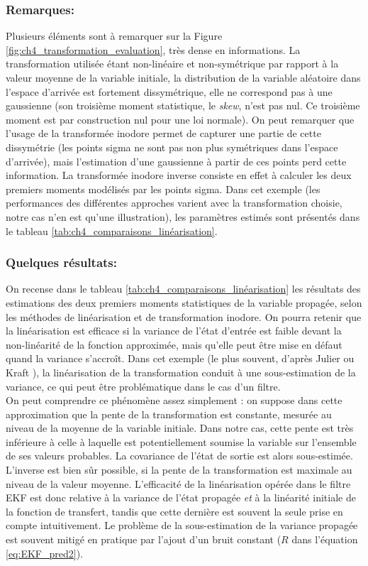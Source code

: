\subsubsection{Remarques:}
Plusieurs éléments sont à remarquer sur la Figure \ref{fig:ch4_transformation_evaluation}, très dense en informations. La transformation utilisée étant non-linéaire et non-symétrique par rapport à la valeur moyenne de la variable initiale, la distribution de la variable aléatoire dans l'espace d'arrivée est fortement dissymétrique, elle ne correspond pas à une gaussienne (son troisième moment statistique, le \og \emph{skew}\fg{}, n'est pas nul. Ce troisième moment est par construction nul pour une loi normale). On peut remarquer que l'usage de la transformée inodore permet de capturer une partie de cette dissymétrie (les points sigma ne sont pas non plus symétriques dans l'espace d'arrivée), mais l'estimation d'une gaussienne à partir de ces points perd cette information. La transformée inodore inverse consiste en effet à calculer les deux premiers moments modélisés par les points sigma. Dans cet exemple (les performances des différentes approches varient avec la transformation choisie, notre cas n'en est qu'une illustration), les paramètres estimés sont présentés dans le tableau \ref{tab:ch4_comparaisons_linéarisation}.

\subsubsection{Quelques résultats:}
On recense dans le tableau \ref{tab:ch4_comparaisons_linéarisation} les résultats des estimations des deux premiers moments statistiques de la variable propagée, selon les méthodes de linéarisation et de transformation inodore. On pourra retenir que la linéarisation est efficace si la variance de l'état d'entrée est faible devant la non-linéarité de la fonction approximée, mais qu'elle peut être mise en défaut quand la variance s'accroît. Dans cet exemple (le plus souvent, d'après Julier ou Kraft \cite{Julier1997, Kraft2003}), la linéarisation de la transformation conduit à une sous-estimation de la variance, ce qui peut être problématique dans le cas d'un filtre. \\

On peut comprendre ce phénomène assez simplement : on suppose dans cette approximation que la pente de la transformation est constante, mesurée au niveau de la moyenne de la variable initiale. Dans notre cas, cette pente est très inférieure à celle à laquelle est potentiellement soumise la variable sur l'ensemble de ses valeurs probables. La covariance de l'état de sortie est alors sous-estimée. L'inverse est bien sûr possible, si la pente de la transformation est maximale au niveau de la valeur moyenne. L'efficacité de la linéarisation opérée dans le filtre EKF est donc relative à la variance de l'état propagée \textit{et} à la linéarité initiale de la fonction de transfert, tandis que cette dernière est souvent la seule prise en compte intuitivement. Le problème de la sous-estimation de la variance propagée est souvent mitigé en pratique par l'ajout d'un bruit constant ($R$ dans l'équation \ref{eq:EKF_pred2}).

